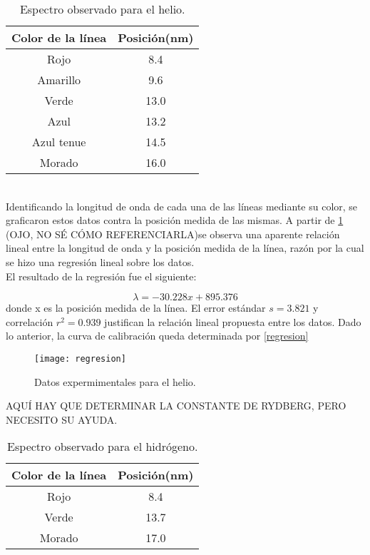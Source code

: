 \documentclass[prb,aps,twocolumn,preprintnumbers,amsmath,amssymb]{revtex4}
\begin{document}
\begin{table}[h!]
	\caption{\label{Tabla 1}Espectro observado para el helio.}
	\begin{ruledtabular}
		\begin{tabular}{cc}
			Color de la línea&Posición(nm)\\
			\hline
			Rojo & 8.4\\
			Amarillo & 9.6\\
			Verde & 13.0\\
			Azul & 13.2\\
			Azul tenue & 14.5\\
			Morado & 16.0\\
		\end{tabular}
	\end{ruledtabular}
\end{table}
\
\\
\indent
Identificando la longitud de onda de cada una de las líneas mediante su color, se graficaron estos datos contra la posición medida de las mismas. A partir de \ref{fig 2} (OJO, NO SÉ CÓMO REFERENCIARLA)se observa una aparente relación lineal entre la longitud de onda y la posición medida de la línea, razón por la cual se hizo una regresión lineal sobre los datos. 
\\

El resultado de la regresión fue el siguiente:

\begin{equation}
\label{regresion}
\lambda = -30.228x + 895.376
\end{equation}
\noindent
donde x es la posición medida de la línea. El error estándar $s = 3.821$ y correlación $r^2 = 0.939$ justifican la relación lineal propuesta entre los datos. Dado lo anterior, la curva de calibración queda determinada por \eqref{regresion}
\begin{figure}[h!]
	\label{fig 2}
	\centering
	\texttt{[image: regresion]}
	\caption{Datos expermimentales para el helio.}
\end{figure}

AQUÍ HAY QUE DETERMINAR LA CONSTANTE DE RYDBERG, PERO NECESITO SU AYUDA.
\begin{table}[h!]
\caption{\label{Tabla 2}Espectro observado para el hidrógeno.}
\begin{ruledtabular}
\begin{tabular}{cc}
Color de la línea&Posición(nm)\\
\hline
Rojo & 8.4\\
Verde & 13.7\\
Morado & 17.0\\
\end{tabular}
\end{ruledtabular}
\end{table}
\end{document}

